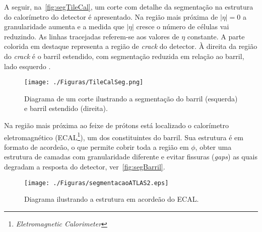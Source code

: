 A seguir, na~\autoref{fig:segTileCal}, um corte com detalhe da segmentação na estrutura do calorímetro do detector é apresentado. Na região mais próxima de $|\eta|=0$ a granularidade aumenta e a medida que $|\eta|$ cresce o número de células vai reduzindo. As linhas tracejadas referem-se aos valores de $\eta$ constante. A parte colorida em destaque representa a região de \textit{crack} do detector. À direita da região do \textit{crack} é o barril estendido, com segmentação reduzida em relação ao barril, lado esquerdo \cite{thesis:werner2018}.

\begin{figure}[H]
	\begin{center}
		\caption{Diagrama de um corte ilustrando a segmentação do barril (esquerda) e barril estendido (direita). }
		\texttt{[image: ./Figuras/TileCalSeg.png]}
		\label{fig:segTileCal}
	\end{center}
\end{figure}



Na região mais próxima ao feixe de prótons está localizado o calorímetro eletromagnético (ECAL\footnote{\textit{Eletromagnetic Calorimeter}}), um dos constituintes do barril. Sua estrutura é em formato de acordeão, o que permite cobrir toda a região em $\phi$, obter uma estrutura de camadas com granularidade diferente e evitar fissuras (\textit{gaps}) as quais degradam a resposta do detector, ver~\autoref{fig:segBarril}.

\begin{figure}[H]
	\begin{center}
		\caption{Diagrama ilustrando a estrutura em acordeão do ECAL. }
		\texttt{[image: ./Figuras/segmentacaoATLAS2.eps]}
		\label{fig:segBarril}
	\end{center}
\end{figure}


